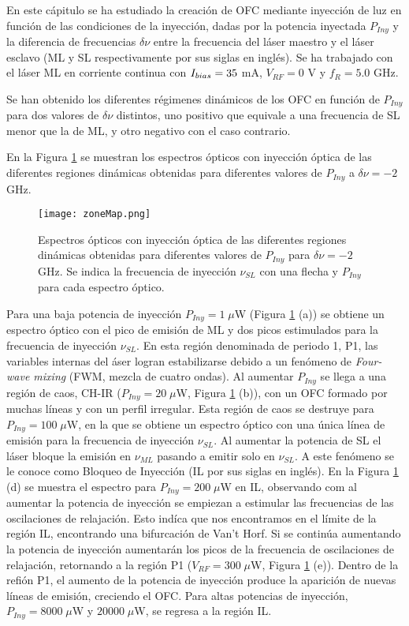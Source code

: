 \graphicspath{{../Graphics/Cpt2-InjectCW/}}

En este cápitulo se ha estudiado la creación de OFC mediante inyección de luz en función de las condiciones de la inyección, dadas por la potencia inyectada $P_{Iny}$ y la diferencia de frecuencias $\delta \nu$ entre la frecuencia del láser maestro y el láser esclavo (ML y SL respectivamente por sus siglas en inglés). Se ha trabajado con el láser ML en corriente continua con $I_{bias} = 35$ mA, $V_{RF} = 0$ V y $f_R = 5.0$ GHz.

Se han obtenido los diferentes régimenes dinámicos de los OFC en función de $P_{Iny}$ para dos valores de $\delta\nu$ distintos, uno positivo que equivale a una frecuencia de SL menor que la de ML, y otro negativo con el caso contrario.

En la Figura \ref{Img:zonasIO} se muestran los espectros ópticos con inyecci\'on \'optica de las diferentes regiones dinámicas obtenidas para diferentes valores de $P_{Iny}$ a $\delta\nu = -2$ GHz. 

			\begin{figure}[H]
				\centering
				\texttt{[image: zoneMap.png]}
				\caption{\label{Img:zonasIO}Espectros ópticos con inyección \'optica de las diferentes regiones dinámicas obtenidas para diferentes valores de $P_{Iny}$ para $\delta\nu = -2$ GHz. Se indica la frecuencia de inyección $\nu_{SL}$ con una flecha y $P_{Iny}$ para cada espectro óptico.}
			\end{figure}

		Para una baja potencia de inyección $P_{Iny} = 1 \; \mu$W (Figura \ref{Img:zonasIO} (a)) se obtiene un espectro óptico con el pico de emisión de ML y dos picos estimulados para la frecuencia de inyección $\nu_{SL}$. En esta región denominada de periodo 1, P1, las variables internas del áser logran estabilizarse \cite{vainio2006diode} debido a un fenómeno de \textit{Four-wave mixing} (FWM, mezcla de cuatro ondas). Al aumentar $P_{Iny}$ se llega a una región de caos, CH-IR ($P_{Iny} = 20\; \mu$W, Figura \ref{Img:zonasIO} (b)), con un OFC formado por muchas líneas y con un perfil irregular. Esta región de caos se destruye para $P_{Iny} = 100\;\mu$W, en la que se obtiene un espectro óptico con una única línea de emisión para la frecuencia de inyección $\nu_{SL}$. Al aumentar la potencia de SL el láser bloque la emisión en $\nu_{ML}$ pasando a emitir solo en $\nu_{SL}$. A este fenómeno se le conoce como Bloqueo de Inyección (IL por sus siglas en inglés). En la Figura \ref{Img:zonasIO} (d) se muestra el espectro para $P_{Iny} = 200\;\mu$W en IL, observando com al aumentar la potencia de inyección se empiezan a estimular las frecuencias de las oscilaciones de relajación. Esto indíca que nos encontramos en el límite de la región IL, encontrando una bifurcación de Van't Horf. Si se continúa aumentando la potencia de inyección aumentarán los picos de la frecuencia de oscilaciones de relajación, retornando a la región P1 ($V_{RF} = 300\;\mu$W, Figura \ref{Img:zonasIO} (e)). Dentro de la refión P1, el aumento de la potencia de inyección produce la aparición de nuevas líneas de emisión, creciendo el OFC. Para altas potencias de inyección, $P_{Iny} = 8000 \;\mu$W y $20000 \;\mu$W, se regresa a la región IL.

